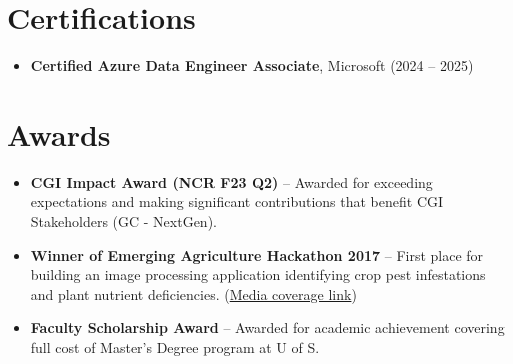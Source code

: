 \documentclass[10pt,letterpaper]{article}
\begin{document}
\section{Certifications}
\begin{itemize}
    \item \textbf{Certified Azure Data Engineer Associate}, Microsoft \hfill (2024 -- 2025)
\end{itemize}

\section{Awards}
\begin{itemize}
    \item \textbf{CGI Impact Award (NCR F23 Q2)} -- Awarded for exceeding expectations and making significant contributions that benefit CGI Stakeholders (GC - NextGen).
    \item \textbf{Winner of Emerging Agriculture Hackathon 2017} -- First place for building an image processing application identifying crop pest infestations and plant nutrient deficiencies. (\href{http://bit.ly/agricultural-hackathon-2017}{Media coverage link})
    \item \textbf{Faculty Scholarship Award} -- Awarded for academic achievement covering full cost of Master's Degree program at U of S.
\end{itemize}
\end{document}
